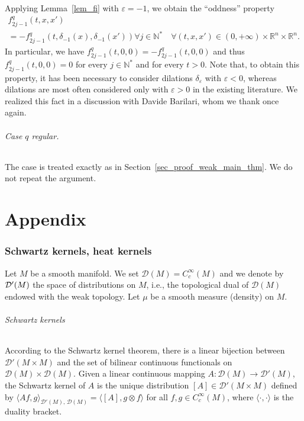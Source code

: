 \documentclass[AHL,Unicode,published]{cedram}
\newcommand*\R{\mathbb{R}}
\newcommand*\N{\mathbb{N}}
\newcommand{\calD}{\mathcal{D}}
\let\oldforall\forall
\renewcommand*{\forall}{\mathrel{\oldforall}}
\begin{document}
\begin{rema}
Applying Lemma~\ref{lem_fi} with $\varepsilon=-1$, we obtain the ``oddness'' property
\begin{multline*}
f^{q}_{2j-1}(t,x,x')\\
 = -f^{q}_{2j-1}\left(t,\delta_{-1}(x),\delta_{-1}(x')\right) 
\forall j\in\N^*\quad\forall (t,x,x')\in(0,+\infty)\times\R^n\times\R^n.
\end{multline*}
In particular, we have $f^{q}_{2j-1}(t,0,0) = -f^{q}_{2j-1}(t,0,0)$ and thus $f^{q}_{2j-1}(t,0,0)=0$ for every $j\in\N^*$ and for every $t>0$. Note that, to obtain this property, it has been necessary to consider dilations $\delta_\varepsilon$ with $\varepsilon<0$, whereas dilations are most often considered only with $\varepsilon>0$ in the existing literature. We realized this fact in a discussion with Davide Barilari, whom we thank once again.
\end{rema}


\paragraph{Case $q$ regular.} The case is treated exactly as in Section~\ref{sec_proof_weak_main_thm}. We do not repeat the argument.



\goodbreak
\appendix
{\Large
\part{Appendix}\label{part_appendix}
}


 
\section{Schwartz kernels, heat kernels}\label{appendix_Schwartz}
Let $M$ be a smooth manifold. We set $\calD(M)=C_c^\infty(M)$ and we denote by $\calD'\linebreak(M)$ the space of distributions on $M$, i.e., the topological dual of $\calD(M)$ endowed with the weak topology. Let $\mu$ be a smooth measure (density) on $M$.



\goodbreak
\paragraph{Schwartz kernels}
According to the Schwartz kernel theorem, there is a linear bijection between $\calD'(M\times M)$ and the set of bilinear continuous functionals on $\calD(M)\times \calD(M)$. Given a linear continuous mapping $A: \calD(M)\rightarrow \calD'(M)$, the Schwartz kernel of $A$ is the unique distribution $[A]\in \calD'(M\times M)$ defined by $\langle Af,g\rangle_{\calD'(M),\,\calD(M)} = \langle [A],g\otimes f\rangle$ for all $f,g\in C_c^\infty(M)$, where $\langle\cdot,\cdot\rangle$ is the duality bracket.
\end{document}
